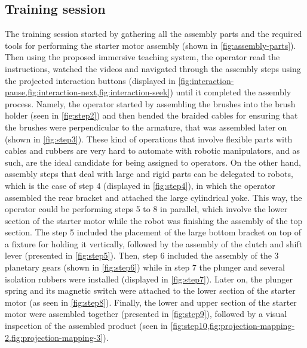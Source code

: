 \subsection{Training session}

The training session started by gathering all the assembly parts and the required tools for performing the starter motor assembly (shown in \cref{fig:assembly-parts}). Then using the proposed immersive teaching system, the operator read the instructions, watched the videos and navigated through the assembly steps using the projected interaction buttons (displayed in \cref{fig:interaction-pause,fig:interaction-next,fig:interaction-seek}) until it completed the assembly process. Namely, the operator started by assembling the brushes into the brush holder (seen in \cref{fig:step2}) and then bended the braided cables for ensuring that the brushes were perpendicular to the armature, that was assembled later on (shown in \cref{fig:step3}). These kind of operations that involve flexible parts with cables and rubbers are very hard to automate with robotic manipulators, and as such, are the ideal candidate for being assigned to operators. On the other hand, assembly steps that deal with large and rigid parts can be delegated to robots, which is the case of step 4 (displayed in \cref{fig:step4}), in which the operator assembled the rear bracket and attached the large cylindrical yoke. This way, the operator could be performing steps 5 to 8 in parallel, which involve the lower section of the starter motor while the robot was finishing the assembly of the top section. The step 5 included the placement of the large bottom bracket on top of a fixture for holding it vertically, followed by the assembly of the clutch and shift lever (presented in \cref{fig:step5}). Then, step 6 included the assembly of the 3 planetary gears (shown in \cref{fig:step6}) while in step 7 the plunger and several isolation rubbers were installed (displayed in \cref{fig:step7}). Later on, the plunger spring and its magnetic switch were attached to the lower section of the starter motor (as seen in \cref{fig:step8}). Finally, the lower and upper section of the starter motor were assembled together (presented in \cref{fig:step9}), followed by a visual inspection of the assembled product (seen in \cref{fig:step10,fig:projection-mapping-2,fig:projection-mapping-3}).

